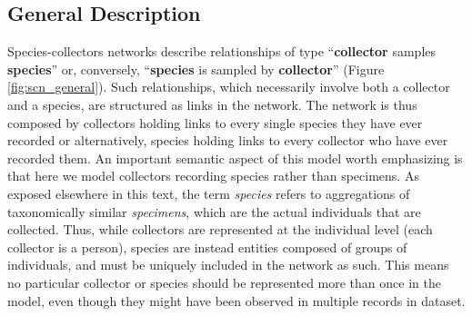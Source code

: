 \subsection{General Description}
Species-collectors networks describe relationships of type ``\textbf{collector} samples \textbf{species}'' or, conversely, ``\textbf{species} is sampled by \textbf{collector}'' (Figure \ref{fig:scn_general}). Such relationships, which necessarily involve both a collector and a species, are structured as links in the network.
The network is thus composed by collectors holding links to every single species they have ever recorded or alternatively, species holding links to every collector who have ever recorded them.
An important semantic aspect of this model worth emphasizing is that here we model collectors recording species rather than specimens. As exposed elsewhere in this text, the term \textit{species} refers to aggregations of taxonomically similar \textit{specimens}, which are the actual individuals that are collected. Thus, while collectors are represented at the individual level (each collector is a person), species are instead entities composed of groups of individuals, and must be uniquely included in the network as such.
This means no particular collector or species should be represented more than once in the model, even though they might have been observed in multiple records in dataset.

